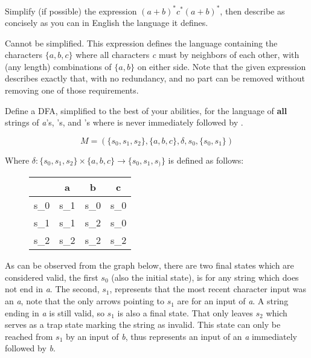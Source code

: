 \documentclass[12pt]{jhwhw}
\begin{document}
\problem{}

	Simplify (if possible) the expression $(a+b)^*c^*(a+b)^*$, then describe as concisely as you can
	in English the language it defines.

\solution

	Cannot be simplified.
	\bigbreak
	This expression defines the language containing the characters $\{a,b,c\}$ where all characters \textit{c} must
	by neighbors of each other, with (any length) combinations of $\{a,b\}$ on either side.
	Note that the given expression describes exactly that, with no redundancy, 
	and no part can be removed without removing one of those requirements.

\problem{}

	Define a DFA, simplified to the best of your abilities, for the language of \textbf{all} strings of 
	\textit{a}'s, 's, and 's where  is never immediately followed by .

\solution

	$$
		M = (\{s_0,s_1,s_2\},\{a,b,c\},\delta, s_0, \{s_0,s_1\})
	$$

	Where $\delta: \{s_0, s_1, s_2\} \times \{a,b,c\} \rightarrow \{s_0,s_1,s_)\}$ is defined as follows: \\
	\begin{figure}[htp]
		\centering
		\begin{tabular}{||c|c c c||}
			\hline
			\delta & a & b & c \\ \hline
			s_0 & s_1 & s_0 & s_0 \\ \hline
			s_1 & s_1 & s_2 & s_0 \\ \hline
			s_2 & s_2 & s_2 & s_2 \\ \hline
		\end{tabular}
	\end{figure}

	As can be observed from the graph below, there are two final states which are considered valid,
	the first $s_0$ (also the initial state), is for any string which does not end in \textit{a}.
	The second, $s_1$, represents that the most recent character input was an \textit{a}, note that
	the only arrows pointing to $s_1$ are for an input of \textit{a}. A string ending in \textit{a} is still
	valid, so $s_1$ is also a final state. That only leaves $s_2$ which serves as a trap state marking
	the string as invalid. This state can only be reached from $s_1$ by an input of \textit{b}, thus 
	represents an input of an \textit{a} immediately followed by \textit{b}.
\end{document}
